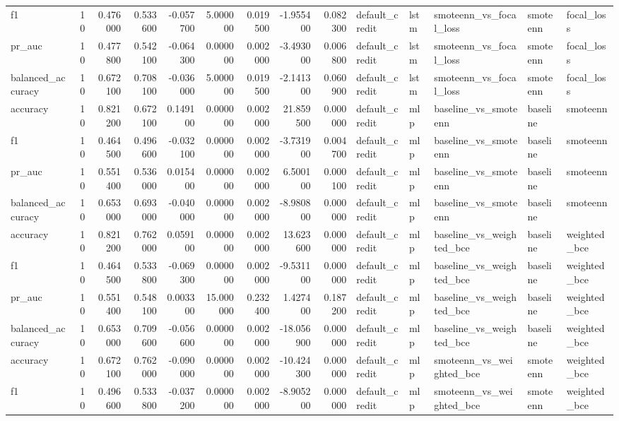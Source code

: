 \begin{tabular}{lrrrrrrrrlllll}
f1 & 10 & 0.476000 & 0.533600 & -0.057700 & 5.000000 & 0.019500 & -1.955400 & 0.082300 & default_credit & lstm & smoteenn_vs_focal_loss & smoteenn & focal_loss \\
pr_auc & 10 & 0.477800 & 0.542100 & -0.064300 & 0.000000 & 0.002000 & -3.493000 & 0.006800 & default_credit & lstm & smoteenn_vs_focal_loss & smoteenn & focal_loss \\
balanced_accuracy & 10 & 0.672100 & 0.708100 & -0.036000 & 5.000000 & 0.019500 & -2.141300 & 0.060900 & default_credit & lstm & smoteenn_vs_focal_loss & smoteenn & focal_loss \\
accuracy & 10 & 0.821200 & 0.672100 & 0.149100 & 0.000000 & 0.002000 & 21.859500 & 0.000000 & default_credit & mlp & baseline_vs_smoteenn & baseline & smoteenn \\
f1 & 10 & 0.464500 & 0.496600 & -0.032100 & 0.000000 & 0.002000 & -3.731900 & 0.004700 & default_credit & mlp & baseline_vs_smoteenn & baseline & smoteenn \\
pr_auc & 10 & 0.551400 & 0.536000 & 0.015400 & 0.000000 & 0.002000 & 6.500100 & 0.000100 & default_credit & mlp & baseline_vs_smoteenn & baseline & smoteenn \\
balanced_accuracy & 10 & 0.653000 & 0.693000 & -0.040000 & 0.000000 & 0.002000 & -8.980800 & 0.000000 & default_credit & mlp & baseline_vs_smoteenn & baseline & smoteenn \\
accuracy & 10 & 0.821200 & 0.762000 & 0.059100 & 0.000000 & 0.002000 & 13.623600 & 0.000000 & default_credit & mlp & baseline_vs_weighted_bce & baseline & weighted_bce \\
f1 & 10 & 0.464500 & 0.533800 & -0.069300 & 0.000000 & 0.002000 & -9.531100 & 0.000000 & default_credit & mlp & baseline_vs_weighted_bce & baseline & weighted_bce \\
pr_auc & 10 & 0.551400 & 0.548100 & 0.003300 & 15.000000 & 0.232400 & 1.427400 & 0.187200 & default_credit & mlp & baseline_vs_weighted_bce & baseline & weighted_bce \\
balanced_accuracy & 10 & 0.653000 & 0.709600 & -0.056600 & 0.000000 & 0.002000 & -18.056900 & 0.000000 & default_credit & mlp & baseline_vs_weighted_bce & baseline & weighted_bce \\
accuracy & 10 & 0.672100 & 0.762000 & -0.090000 & 0.000000 & 0.002000 & -10.424300 & 0.000000 & default_credit & mlp & smoteenn_vs_weighted_bce & smoteenn & weighted_bce \\
f1 & 10 & 0.496600 & 0.533800 & -0.037200 & 0.000000 & 0.002000 & -8.905200 & 0.000000 & default_credit & mlp & smoteenn_vs_weighted_bce & smoteenn & weighted_bce \\

\end{tabular}
